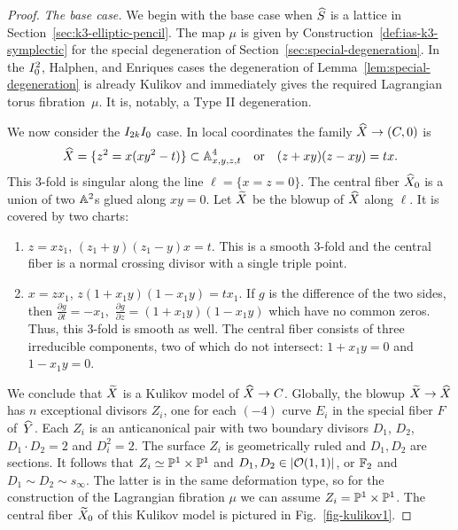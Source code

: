 \documentclass{amsart}
\begin{document}
\begin{proof}
  \emph{The base case.}
  We begin with the base case when ${\widehat S}$ is a lattice in
  Section~\ref{sec:k3-elliptic-pencil}. 
  The map $\mu$ is given by Construction~\ref{def:ias-k3-symplectic}
  for the special degeneration of
  Section~\ref{sec:special-degeneration}. 
  In the $I_0^2$, Halphen, and Enriques cases the degeneration of
  Lemma~\ref{lem:special-degeneration} is already Kulikov and
  immediately gives the required Lagrangian torus fibration~$\mu$.
  It is, notably, a Type II degeneration.

  We now consider the $I_{2k}I_0$ case. In local coordinates the
  family ${\widehat X}\to (C,0)$ is
\begin{displaymath}
  {\widehat X} = \{ z^2 = x(xy^2 - t) \} \subset {\mathbb A}^4_{x,y,z,t}
  \quad \text{or} \quad (z+xy)(z-xy) = tx.
\end{displaymath}
This $3$-fold is singular along the line $\ell = \{x=z=0\}$. The
central fiber ${\widehat X}_0$ is a union of two ${\mathbb A}^2$s glued along $xy=0$. 
Let ${\widetilde X}$ be the blowup of ${\widehat X}$ along $\ell$. It is covered by two charts:
\begin{enumerate}
\item[Chart $1$] $z=xz_1$, $(z_1+y)(z_1-y)x=t$. This is a smooth
  $3$-fold and the central fiber is a normal crossing divisor with a
  single triple point.
\item[Chart $2$] $x=zx_1$, $z(1+x_1y)(1-x_1y) = tx_1$. If $g$ is the
  difference of the two sides, then
  \begin{math}
    \frac{\partial g}{\partial t} = -x_1, \,\,
    \frac{\partial g}{\partial z} = (1+x_1y)(1-x_1y)
  \end{math}
  which have no common zeros. Thus, this $3$-fold is smooth as
  well. The central fiber consists of three irreducible components,
  two of which do not intersect: $1+x_1y=0$ and $1-x_1y=0$.
\end{enumerate}

We conclude that ${\widetilde X}$ is a Kulikov model of ${\widehat X}\to C$. Globally, the
blowup ${\widetilde X}\to {\widehat X}$ has $n$ exceptional divisors $Z_i$, one for each
$(-4)$ curve $E_i$ in the special fiber $F$ of~${\widehat Y}$. Each $Z_i$ is an
anticanonical pair with two boundary divisors $D_1$, $D_2$, $D_1\cdot D_2=2$
and $D_i^2=2$. The surface $Z_i$ is geometrically ruled and $D_1,D_2$
are sections. It follows that $Z_i\simeq {\mathbb P}^1\times{\mathbb P}^1$ and
$D_1,D_2\in |{\mathcal O}(1,1)|$, or ${\mathbb F}_2$ and $D_1\sim D_2\sim
s_\infty$. The latter is in the same deformation type, so for the
construction of the Lagrangian fibration $\mu$ we can assume
$Z_i={\mathbb P}^1\times{\mathbb P}^1$. The central fiber ${\widetilde X}_0$ of this Kulikov
model is pictured in Fig.~\ref{fig-kulikov1}.


\end{proof}
\end{document}
